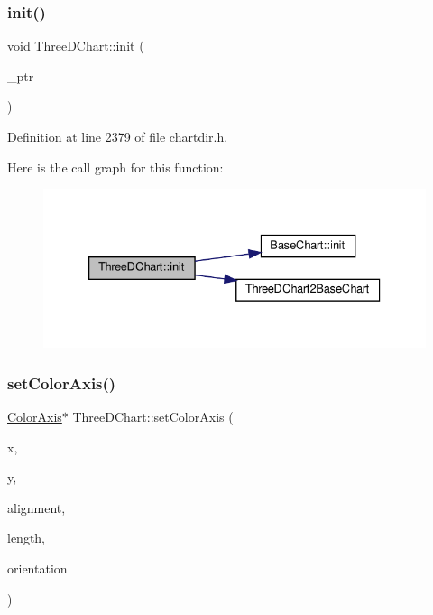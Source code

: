 \subsubsection{\texorpdfstring{init()}{init()}}
{\footnotesize\ttfamily void Three\+D\+Chart\+::init (\begin{DoxyParamCaption}\item[{Three\+D\+Chart\+Internal $\ast$}]{\+\_\+ptr }\end{DoxyParamCaption})\hspace{0.3cm}{\ttfamily [inline]}}



Definition at line 2379 of file chartdir.\+h.

Here is the call graph for this function\+:
\nopagebreak
\begin{figure}[H]
\begin{center}
\leavevmode
\includegraphics[width=333pt]{class_three_d_chart_a5ba1408237d21a7d894d212d4a2ca857_cgraph}
\end{center}
\end{figure}
\mbox{\label{class_three_d_chart_a23f0c5861b70941b12c96e45d7f3a754}} 
\subsubsection{\texorpdfstring{set\+Color\+Axis()}{setColorAxis()}}
{\footnotesize\ttfamily \hyperlink{class_color_axis}{Color\+Axis}$\ast$ Three\+D\+Chart\+::set\+Color\+Axis (\begin{DoxyParamCaption}\item[{int}]{x,  }\item[{int}]{y,  }\item[{int}]{alignment,  }\item[{int}]{length,  }\item[{int}]{orientation }\end{DoxyParamCaption})\hspace{0.3cm}{\ttfamily [inline]}}



